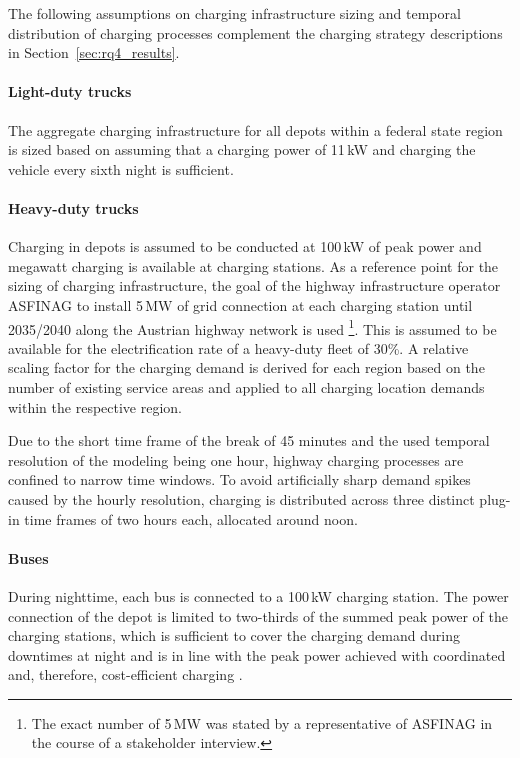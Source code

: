 The following assumptions on charging infrastructure sizing and temporal distribution of charging processes complement the charging strategy descriptions in Section~\ref{sec:rq4_results}.

\paragraph*{Light-duty trucks}
The aggregate charging infrastructure for all depots within a federal state region is sized based on assuming that a charging power of 11\,kW and charging the vehicle every sixth night is sufficient.

\paragraph*{Heavy-duty trucks}
Charging in depots is assumed to be conducted at 100\,kW of peak power and megawatt charging is available at charging stations. As a reference point for the sizing of charging infrastructure, the goal of the highway infrastructure operator ASFINAG to install 5\,MW of grid connection at each charging station until 2035/2040 along the Austrian highway network is used \cite{ioebenergiespeicher}\footnote{The exact number of 5\,MW was stated by a representative of ASFINAG in the course of a stakeholder interview.}. This is assumed to be available for the electrification rate of a heavy-duty fleet of 30\%. A relative scaling factor for the charging demand is derived for each region based on the number of existing service areas and applied to all charging location demands within the respective region.

Due to the short time frame of the break of 45 minutes and the used temporal resolution of the modeling being one hour, highway charging processes are confined to narrow time windows. To avoid artificially sharp demand spikes caused by the hourly resolution, charging is distributed across three distinct plug-in time frames of two hours each, allocated around noon.

\paragraph*{Buses}
During nighttime, each bus is connected to a 100\,kW charging station. The power connection of the depot is limited to two-thirds of the summed peak power of the charging stations, which is sufficient to cover the charging demand during downtimes at night and is in line with the peak power achieved with coordinated and, therefore, cost-efficient charging \cite{Borlaug2021}.

